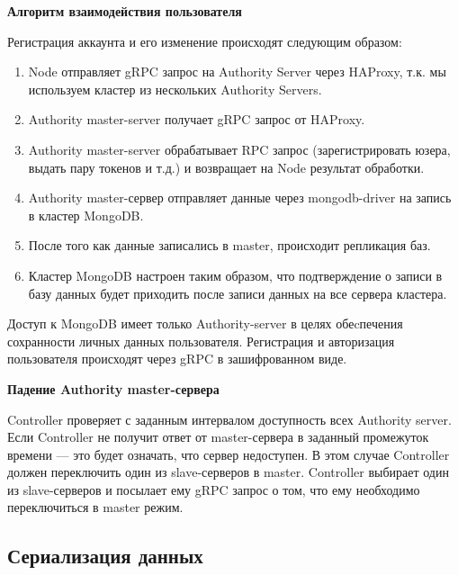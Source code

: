 \textbf{Алгоритм взаимодействия пользователя}

Регистрация аккаунта и его изменение происходят следующим образом:

\begin{enumerate}
    \item Node отправляет gRPC запрос на Authority Server через HAProxy, т.к. мы используем кластер из нескольких Authority Servers.
    \item Authority master-server получает gRPC запрос от HAProxy.
    \item Authority master-server обрабатывает RPC запрос (зарегистрировать юзера, выдать пару токенов и т.д.) и возвращает на Node результат обработки.
    \item Authority master-сервер отправляет данные через mongodb-driver на запись в кластер MongoDB.
    \item После того как данные записались в master, происходит репликация баз.
    \item Кластер MongoDB настроен таким образом, что подтверждение о записи в базу данных будет приходить после записи данных на все сервера кластера.
\end{enumerate}

Доступ к MongoDB имеет только Authority-server в целях обеcпечения сохранности личных данных пользователя. Регистрация и авторизация пользователя происходят через gRPC в зашифрованном виде.

\textbf{Падение Authority master-сервера}

Controller проверяет с заданным интервалом доступность всех Authority server. Если Controller не получит ответ от master-сервера в заданный промежуток времени — это будет означать, что сервер недоступен. В этом случае Controller должен переключить один из slave-серверов в master. Controller выбирает один из slave-серверов и посылает ему gRPC запрос о том, что ему необходимо переключиться в master режим.

\subsection{Сериализация данных}

